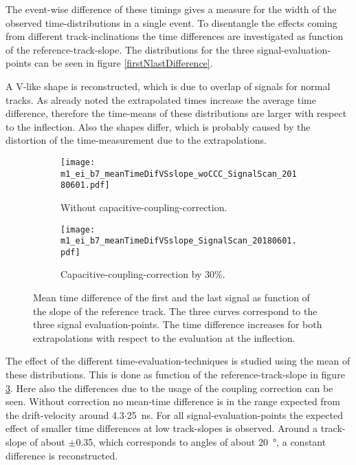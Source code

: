 \documentclass[
twoside,            %
BCOR1.4cm,          %
10pt,               %
headings=normal,    %
headsepline,        %
clearplainpage,		%
final,              %
div=14,
open=right,
bibliography=toc
]{scrreprt}
\begin{document}
The event-wise difference of these timings gives a measure for the width of the observed time-distributions in a single event.
To disentangle the effects coming from different track-inclinations the time differences are investigated as function of the reference-track-slope.
The distributions for the three signal-evaluation-points can be seen in figure \ref{firstNlastDifference}.

A V-like shape is reconstructed, which is due to overlap of signals for normal tracks.
As already noted the extrapolated times increase the average time difference, therefore the time-means of these distributions are larger with respect to the inflection.
Also the shapes differ, which is probably caused by the distortion of the time-measurement due to the extrapolations. 

\begin{figure}[!h]
	\begin{subfigure}[b]{0.48\textwidth}
		\centering
		\texttt{[image: m1\_ei\_b7\_meanTimeDifVSslope\_woCCC\_SignalScan\_20180601.pdf]}
		\caption{
			Without capacitive-coupling-correction.
		}
		\label{timeDifFirstNlastVSslope_mean_woCCC} 
	\end{subfigure}
	\hfill
	\begin{subfigure}[b]{0.48\textwidth}
		\centering
		\texttt{[image: m1\_ei\_b7\_meanTimeDifVSslope\_SignalScan\_20180601.pdf]}
		\caption{
			Capacitive-coupling-correction by 30\%.
		}
		\label{timeDifFirstNlastVSslope_mean_CCC30} 
	\end{subfigure}
	\vspace{-2mm}
	\caption{
		Mean time difference of the first and the last signal as function of the slope of the reference track.
		The three curves correspond to the three signal evaluation-points.
		The time difference increases for both extrapolations with respect to the evaluation at the inflection.
	}
	\label{timeDifFirstNlastVSslope}
\end{figure}

The effect of the different time-evaluation-techniques is studied using the mean of these distributions.
This is done as function of the reference-track-slope in figure \ref{timeDifFirstNlastVSslope}.
Here also the differences due to the usage of the coupling correction can be seen.
Without correction no mean-time difference is in the range expected from the drift-velocity around 4.3$\cdot$\SI{25}{ns}.
For all signal-evaluation-points the expected effect of smaller time differences at low track-slopes is observed.
Around a track-slope of about $\pm$0.35, which corresponds to angles of about \SI{20}{\degree}, a constant difference is reconstructed.
\end{document}
